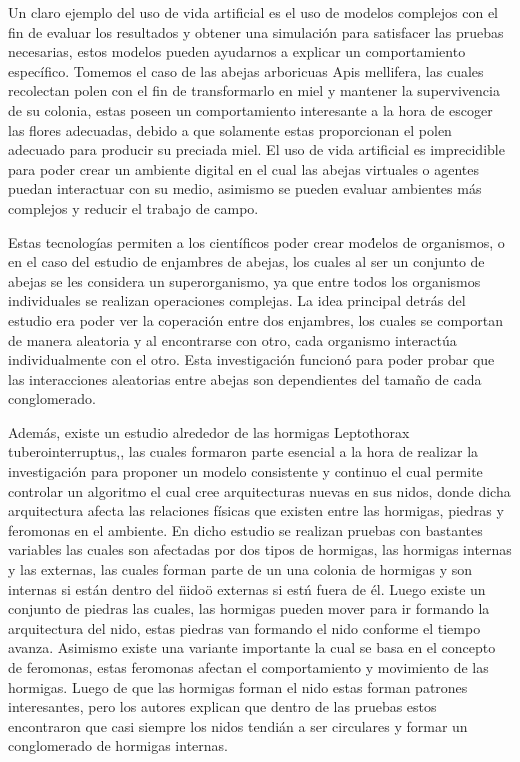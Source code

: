 \documentclass[conference]{IEEEtran}
\begin{document}
Un claro ejemplo del uso de vida artificial es el uso de modelos complejos con el fin de evaluar los resultados y obtener una simulaci\'on para satisfacer las pruebas necesarias, estos modelos pueden ayudarnos a explicar un comportamiento espec\'ifico. Tomemos el caso de las abejas arboricuas Apis mellifera, las cuales recolectan polen con el fin de transformarlo en miel y mantener la supervivencia de su colonia, estas poseen un comportamiento interesante a la hora de escoger las flores adecuadas, debido a que solamente estas proporcionan el polen adecuado para producir su preciada miel. \cite{ZOE01} El uso de vida artificial es imprecidible para poder crear un ambiente digital en el cual las abejas virtuales o agentes puedan interactuar con su medio, asimismo se pueden evaluar ambientes m\'as complejos y reducir el trabajo de campo. 

Estas tecnolog\'ias permiten a los cient\'ificos poder crear mo\'delos de organismos, o en el caso del estudio de enjambres de abejas, los cuales al ser un conjunto de abejas se les considera un superorganismo, ya que entre todos los organismos individuales se realizan operaciones complejas.\cite{TMRT01} La idea principal detr\'as del estudio era poder ver la coperaci\'on entre dos enjambres, los cuales se comportan de manera aleatoria y al encontrarse con otro, cada organismo interact\'ua individualmente con el otro. Esta investigaci\'on funcion\'o para poder probar que las interacciones aleatorias entre abejas son dependientes del tama\~no de cada conglomerado.  

Adem\'as, existe un estudio alrededor de las hormigas  Leptothorax tuberointerruptus,\cite{LP01}, las cuales formaron parte esencial a la hora de realizar la investigaci\'on para proponer un modelo consistente y continuo el cual permite controlar un algoritmo el cual cree arquitecturas nuevas en sus nidos, donde dicha arquitectura afecta las relaciones f\'isicas que existen entre las hormigas, piedras y feromonas en el ambiente.
En dicho estudio se realizan pruebas con bastantes variables las cuales son afectadas por dos tipos de hormigas, las hormigas internas y las externas, las cuales forman parte de un una colonia de hormigas y son internas si est\'an dentro del \"nido\" o externas si est\'n fuera de \'el. Luego existe un conjunto de piedras las cuales, las hormigas pueden mover para ir formando la arquitectura del nido, estas piedras van formando el nido conforme el tiempo avanza. Asimismo existe una variante importante la cual se basa en el concepto de feromonas, estas feromonas afectan el comportamiento y movimiento de las hormigas.\cite{LP01}
Luego de que las hormigas forman el nido estas forman patrones interesantes, pero los autores explican que dentro de las pruebas estos encontraron que casi siempre los nidos tendi\'an a ser circulares y formar un conglomerado de hormigas internas. 
\end{document}
